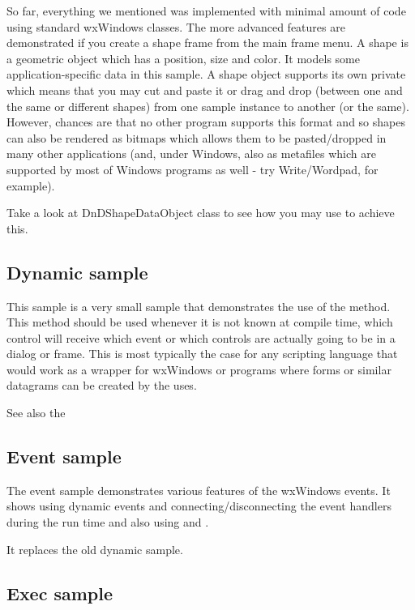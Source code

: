 So far, everything we mentioned was implemented with minimal amount of code
using standard wxWindows classes. The more advanced features are demonstrated
if you create a shape frame from the main frame menu. A shape is a geometric
object which has a position, size and color. It models some
application-specific data in this sample. A shape object supports its own
private  which means that you may cut and
paste it or drag and drop (between one and the same or different shapes) from
one sample instance to another (or the same). However, chances are that no
other program supports this format and so shapes can also be rendered as
bitmaps which allows them to be pasted/dropped in many other applications
(and, under Windows, also as metafiles which are supported by most of Windows
programs as well - try Write/Wordpad, for example).

Take a look at DnDShapeDataObject class to see how you may use 
 to achieve this.

\subsection{Dynamic sample}\label{sampledynamic}

This sample is a very small sample that demonstrates the use of the
 method. This method
should be used whenever it is not known at compile time, which control
will receive which event or which controls are actually going to be in
a dialog or frame. This is most typically the case for any scripting
language that would work as a wrapper for wxWindows or programs where
forms or similar datagrams can be created by the uses.

See also the 

\subsection{Event sample}\label{sampleevent}

The event sample demonstrates various features of the wxWindows events. It
shows using dynamic events and connecting/disconnecting the event handlers
during the run time and also using 
 and
.

It replaces the old dynamic sample.

\subsection{Exec sample}\label{sampleexec}

